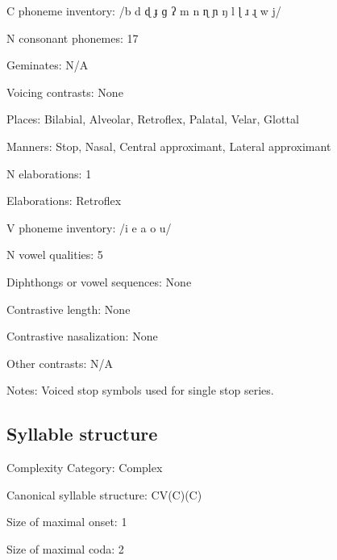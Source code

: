 {\begin{appendixdesc}
\item[C phoneme inventory:] /b d ɖ ɟ ɡ ʔ m n ɳ ɲ ŋ l ɭ ɹ ɻ w j/

\item[N consonant phonemes:] 17

\item[Geminates:] N/A

\item[Voicing contrasts:] None

\item[Places:] Bilabial, Alveolar, Retroflex, Palatal, Velar, Glottal

\item[Manners:] Stop, Nasal, Central approximant, Lateral approximant

\item[N elaborations:] 1

\item[Elaborations:] Retroflex

\item[V phoneme inventory:] /i e a o u/

\item[N vowel qualities:] 5

\item[Diphthongs or vowel sequences:] None

\item[Contrastive length:] None

\item[Contrastive nasalization:] None

\item[Other contrasts:] N/A

\item[Notes:] Voiced stop symbols used for single stop series.
\end{appendixdesc}
\subsection*{Syllable structure}
\begin{appendixdesc}

\item[Complexity Category:] Complex

\item[Canonical syllable structure:] CV(C)(C) \citep[186--196]{Merlan1989}

\item[Size of maximal onset:] 1

\item[Size of maximal coda:] 2


\end{appendixdesc}}
